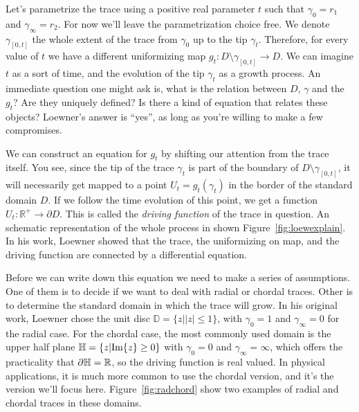 Let's parametrize the trace using a positive real parameter $t$ such that
$\gamma_{0}=r_1$ and $\gamma_{\infty}=r_2$. For now we'll leave the
parametrization choice free. We denote $\gamma_{[0,t]}$ the whole extent of the
trace from $\gamma_0$ up to the tip $\gamma_t$. Therefore, for every value of
$t$ we have a different uniformizing map
$g_t:D\setminus\gamma_{[0,t]}\rightarrow D$. We can imagine $t$ as a sort of
time, and the evolution of the tip $\gamma_t$ as a growth process.
An immediate question one might ask is, what is the relation between $D$,
$\gamma$ and the $g_t$? Are they uniquely defined? Is there a kind of equation
that relates these objects? Loewner's answer is ``yes'', as long as you're
willing to make a few compromises.

We can construct an equation for $g_t$ by shifting our attention from the trace
itself. You see, since the tip of the trace $\gamma_t$ is part of the boundary
of $D\setminus\gamma_{[0,t]}$, it will necessarily get mapped to a point
$U_t=g_t(\gamma_t)$ in the border of the standard domain $D$. If we follow the
time evolution of this point, we get a function
$U_t:\mathbb{R}^+\rightarrow\partial D$. This is called the \textit{driving
    function} of the trace in question. An schematic representation of the
whole process in shown Figure~\ref{fig:loewexplain}. In his work, Loewner
showed that the trace, the uniformizing on map, and the driving function are
connected by a differential equation.

Before we can write down this equation we need to make a series of assumptions.
One of them is to decide if we want to deal with radial or chordal traces.
Other is to determine the standard domain in which the trace will grow. In his
original work, Loewner chose the unit disc $\mathbb{D}=\{z||z|\leq1\}$, with
$\gamma_0=1$ and $\gamma_\infty=0$ for the radial case. For the chordal case,
the most commonly used domain is the upper half plane
$\mathbb{H}=\{z|\mbox{Im}\{z\}\geq0\}$ with $\gamma_0=0$ and $\gamma_\infty=\infty$,
which offers the practicality that $\partial\mathbb{H}=\mathbb{R}$, so the driving
function is real valued. In physical applications, it is much more common to
use the chordal version, and it's the version we'll focus here.
Figure~\ref{fig:radchord} show two examples of radial and chordal traces in
these domains.

